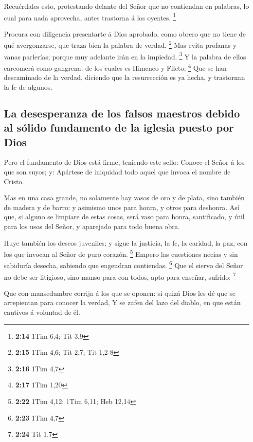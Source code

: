  Recuérdales esto, protestando delante del Señor que no
contiendan en palabras, lo cual para nada aprovecha, antes trastorna á
los oyentes. \footnote{\textbf{2:14} 1Tim 6,4; Tit 3,9}

 Procura con diligencia presentarte á Dios aprobado, como
obrero que no tiene de qué avergonzarse, que traza bien la palabra de
verdad. \footnote{\textbf{2:15} 1Tim 4,6; Tit 2,7; Tit 1,2-8}
 Mas evita profanas y vanas parlerías; porque muy adelante
irán en la impiedad. \footnote{\textbf{2:16} 1Tim 4,7}  Y
la palabra de ellos carcomerá como gangrena: de los cuales es Himeneo y
Fileto; \footnote{\textbf{2:17} 1Tim 1,20}  Que se han
descaminado de la verdad, diciendo que la resurrección es ya hecha, y
trastornan la fe de algunos.

\hypertarget{la-desesperanza-de-los-falsos-maestros-debido-al-suxf3lido-fundamento-de-la-iglesia-puesto-por-dios}{%
\subsection{La desesperanza de los falsos maestros debido al sólido
fundamento de la iglesia puesto por
Dios}\label{la-desesperanza-de-los-falsos-maestros-debido-al-suxf3lido-fundamento-de-la-iglesia-puesto-por-dios}}

 Pero el fundamento de Dios está firme, teniendo este
sello: Conoce el Señor á los que son suyos; y: Apártese de iniquidad
todo aquel que invoca el nombre de Cristo.

 Mas en una casa grande, no solamente hay vasos de oro y de
plata, sino también de madera y de barro: y asimismo unos para honra, y
otros para deshonra.  Así que, si alguno se limpiare de
estas cosas, será vaso para honra, santificado, y útil para los usos del
Señor, y aparejado para todo buena obra.

 Huye también los deseos juveniles; y sigue la justicia, la
fe, la caridad, la paz, con los que invocan al Señor de puro corazón.
\footnote{\textbf{2:22} 1Tim 4,12; 1Tim 6,11; Heb 12,14} 
Empero las cuestiones necias y sin sabiduría desecha, sabiendo que
engendran contiendas. \footnote{\textbf{2:23} 1Tim 4,7} 
Que el siervo del Señor no debe ser litigioso, sino manso para con
todos, apto para enseñar, sufrido; \footnote{\textbf{2:24} Tit 1,7}

 Que con mansedumbre corrija á los que se oponen: si quizá
Dios les dé que se arrepientan para conocer la verdad,  Y
se zafen del lazo del diablo, en que están cautivos á voluntad de él.


